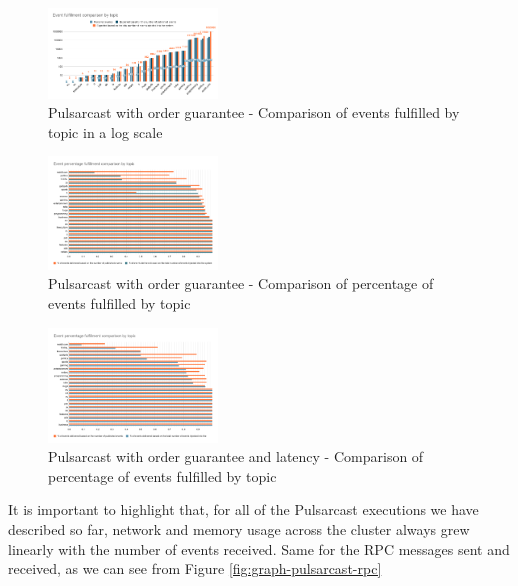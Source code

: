\begin{figure}[!htb]
  \centering
  \includegraphics[width=0.4\textwidth]{../images/graph-pulsarcast-order-event-fulfillment-comparison.png}
  \caption{Pulsarcast with order guarantee - Comparison of events fulfilled by topic in a log scale}
  \label{fig:graph-pulsarcast-order-event-fulfillment-comparison}
\end{figure}

\begin{figure}[!htb]
  \centering
  \includegraphics[width=0.4\textwidth]{../images/graph-pulsarcast-order-event-percentage-fulfillment-comparison.png}
  \caption{Pulsarcast with order guarantee - Comparison of percentage of events fulfilled by topic}
  \label{fig:graph-pulsarcast-order-event-percentage-fulfillment-comparison}
\end{figure}

\begin{figure}[!htb]
  \centering
  \includegraphics[width=0.4\textwidth]{../images/graph-pulsarcast-order-latency-event-percentage-fulfillment-comparison.png}
  \caption{Pulsarcast with order guarantee and latency - Comparison of percentage of events fulfilled by topic}
  \label{fig:graph-pulsarcast-order-latency-event-percentage-fulfillment-comparison}
\end{figure}

It is important to highlight that, for all of the Pulsarcast executions we have
described so far, network and memory usage across the cluster always grew
linearly with the number of events received. Same for the RPC messages sent and
received, as we can see from Figure \ref{fig:graph-pulsarcast-rpc}

